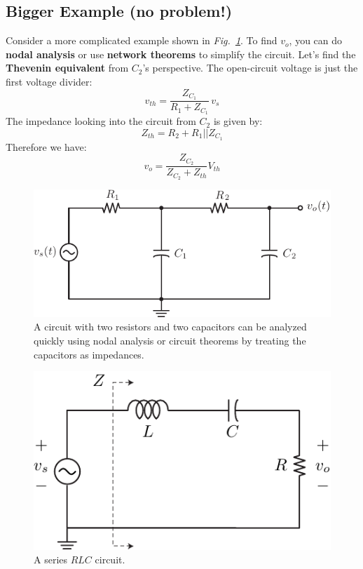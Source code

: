 \subsection{Bigger Example (no problem!)}
Consider a more complicated example shown in \emph{Fig.~\ref{fig:bigexample}}.  To find $v_o$, you can do \textbf{nodal analysis} or use \textbf{network theorems} to simplify the circuit.  Let's find the \textbf{Thevenin equivalent} from $C_2$'s perspective.  The open-circuit voltage is just the first voltage divider:
    \begin{equation}
        v_{th} = \frac{Z_{C_1}}{R_1 + Z_{C_1}}\,v_s 
    \end{equation}
The impedance looking into the circuit from $C_2$ is given by:
    \begin{equation}
        Z_{th} = R_2 + R_1 \big|\big| Z_{C_1}
    \end{equation}
Therefore we have:
    \begin{equation}
        v_o = \frac{Z_{C_2}}{Z_{C_2} + Z_{th}} V_{th} 
    \end{equation}
\begin{figure}[H]
\centering
\includegraphics[angle=-0.0,scale=1]{mod1_3_7_rc_lpf2}
\caption{A circuit with two resistors and two capacitors can be analyzed quickly using nodal analysis or circuit theorems by treating the capacitors as impedances.}
\label{fig:bigexample}
\end{figure}
\newpage
\begin{figure}[t]
\centering
\includegraphics[scale=1]{rlc}
\caption{A series $RLC$ circuit.}
\label{fig:rlc}
\end{figure}

